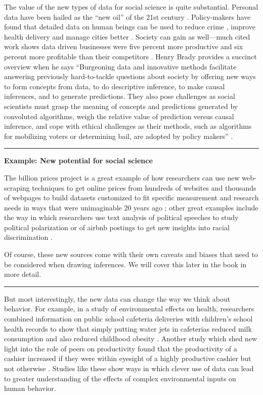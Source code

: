 \documentclass[]{krantz}
\begin{document}
The value of the new types of data for social science is quite
substantial. Personal data have been hailed as the ``new oil'' of the
21st century \citep{greenwood2014}. Policy-makers have found that
detailed data on human beings can be used to reduce crime
\citep{lynch2018}, improve health delivery \citep{pan2017} and manage
cities better \citep{glaeser2019urban}. Society can gain as well---much
cited work shows data driven businesses were five percent more
productive and six percent more profitable than their competitors
\citep{brynjolfsson2011strength}. Henry Brady provides a succinct
overview when he says ``Burgeoning data and innovative methods
facilitate answering previously hard-to-tackle questions about society
by offering new ways to form concepts from data, to do descriptive
inference, to make causal inferences, and to generate predictions. They
also pose challenges as social scientists must grasp the meaning of
concepts and predictions generated by convoluted algorithms, weigh the
relative value of prediction versus causal inference, and cope with
ethical challenges as their methods, such as algorithms for mobilizing
voters or determining bail, are adopted by policy makers''
\citep{brady2019challenge}.

\begin{center}\rule{0.5\linewidth}{\linethickness}\end{center}

\textbf{Example: New potential for social science}

The billion prices project is a great example of how researchers can use
new web-scraping techniques to get online prices from hundreds of
websites and thousands of webpages to build datasets customized to fit
specific measurement and research needs in ways that were unimaginable
20 years ago \citep{cavallo2016billion}; other great examples include
the way in which researchers use text analysis of political speeches to
study political polarization \citep{peterson2018classification} or of
airbnb postings to get new insights into racial discrimination
\citep{edelman2017racial}.

Of course, these new sources come with their own caveats and biases that
need to be considered when drawing inferences. We will cover this later
in the book in more detail.

\begin{center}\rule{0.5\linewidth}{\linethickness}\end{center}

But most interestingly, the new data can change the way we think about
behavior. For example, in a study of environmental effects on health,
researchers combined information on public school cafeteria deliveries
with children's school health records to show that simply putting water
jets in cafeterias reduced milk consumption and also reduced childhood
obesity \citep{schwartz2016effect}. Another study which shed new light
into the role of peers on productivity found that the productivity of a
cashier increased if they were within eyesight of a highly productive
cashier but not otherwise \citep{mas2009peers}. Studies like these show
ways in which clever use of data can lead to greater understanding of
the effects of complex environmental inputs on human behavior.
\end{document}
